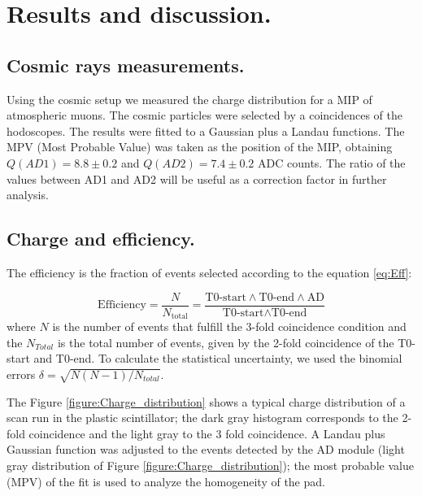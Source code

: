\section{Results and discussion.}

	\subsection{Cosmic rays measurements.}
	
	Using the cosmic setup we measured the charge distribution for a MIP of atmospheric muons. %
	The	cosmic particles were selected by a coincidences of the hodoscopes.
	The results were fitted to a Gaussian plus a Landau functions. The MPV (Most Probable Value)
	was taken as the position of the MIP, obtaining $Q(AD1)=8.8\pm0.2$ and $Q(AD2)=7.4\pm0.2$ ADC counts. The 
	ratio of the values between AD1 and AD2 will be useful as a correction factor in further analysis. 

  \subsection{Charge and efficiency.}
  The efficiency is the fraction of events selected according to the equation \ref{eq:Eff}:
  
  \begin{equation}\label{eq:Eff}
    \textrm{Efficiency}
    = \frac{N}{N_\text{total}}
    =\frac{ \textrm{T0-start}\wedge \textrm{T0-end}\wedge \textrm{AD}}
    {\textrm{T0-start}\wedge \textrm{T0-end} }
  \end{equation}
	where $N$ is the number of events that fulfill the 3-fold coincidence condition
	and the $N_{Total}$ is the total number 
	of events, given by the 2-fold coincidence of the T0-start and T0-end. To calculate the statistical 
	uncertainty, we used the binomial errors $\delta=\sqrt{N(N-1)/N_{total}}$. 

	The Figure \ref{figure:Charge_distribution} shows a typical charge distribution of a scan run in the 
	plastic scintillator; the dark gray	histogram corresponds to the 2-fold coincidence and the light gray to the
	3 fold coincidence. A Landau plus Gaussian function was adjusted to the events detected by the AD module
	(light gray distribution of Figure \ref{figure:Charge_distribution}); the most probable value (MPV) of the
	fit  is used to analyze the homogeneity of the pad. %
	
